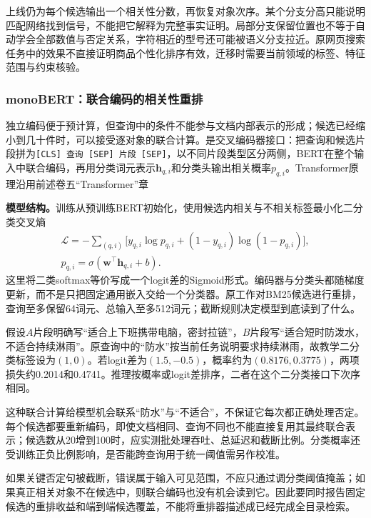 上线仍为每个候选输出一个相关性分数，再恢复对象次序。某个分支分高只能说明匹配网络找到信号，不能把它解释为完整事实证明。局部分支保留位置也不等于自动学会全部数值与否定关系，字符相近的型号还可能被语义分支拉近。原网页搜索任务中的效果不直接证明商品个性化排序有效，迁移时需要当前领域的标签、特征范围与约束核验。

\Needspace{100mm}
\subsubsection{monoBERT：联合编码的相关性重排}
\label{sec:rs-search-monobert}

独立编码便于预计算，但查询中的条件不能参与文档内部表示的形成；候选已经缩小到几十件时，可以接受逐对象的联合计算。是交叉编码器接口：把查询和候选片段拼为\texttt{[CLS] 查询 [SEP] 片段 [SEP]}，以不同片段类型区分两侧，BERT在整个输入中联合编码，再用分类词元表示$\bm h_{q,i}$和分类头输出相关概率$p_{q,i}$。Transformer原理沿用前述卷五“Transformer”章

\textbf{模型结构。}训练从预训练BERT初始化，使用候选内相关与不相关标签最小化二分类交叉熵
\begin{equation}
 \begin{split}
 \mathcal L=-\sum_{(q,i)}
  \bigl[y_{q,i}\log p_{q,i}+(1-y_{q,i})\log(1-p_{q,i})\bigr],\\
 p_{q,i}=\sigma(\bm w^\top\bm h_{q,i}+b).
 \end{split}
 \label{eq:rs-search-monobert}
\end{equation}
这里将二类softmax等价写成一个logit差的Sigmoid形式。编码器与分类头都随梯度更新，而不是只把固定通用嵌入交给一个分类器。原工作对BM25候选进行重排，查询至多保留64词元、总输入至多512词元；截断规则决定模型到底读到了什么。

假设$A$片段明确写“适合上下班携带电脑，密封拉链”，$B$片段写“适合短时防泼水，不适合持续淋雨”。原查询中的“防水”按当前任务说明要求持续淋雨，故教学二分类标签设为$(1,0)$。若logit差为$(1.5,-0.5)$，概率约为$(0.8176,0.3775)$，两项损失约0.2014和0.4741。推理按概率或logit差排序，二者在这个二分类接口下次序相同。

这种联合计算给模型机会联系“防水”与“不适合”，不保证它每次都正确处理否定。每个候选都要重新编码，即使文档相同、查询不同也不能直接复用其最终联合表示；候选数从20增到100时，应实测批处理吞吐、总延迟和截断比例。分类概率还受训练正负比例影响，是否能跨查询用于统一阈值需另作校准。

如果关键否定句被截断，错误属于输入可见范围，不应只通过调分类阈值掩盖；如果真正相关对象不在候选中，则联合编码也没有机会读到它。因此要同时报告固定候选的重排收益和端到端候选覆盖，不能将重排器描述成已经完成全目录检索。

